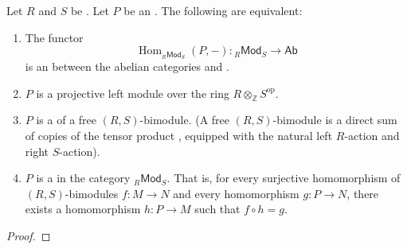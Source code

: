 \begin{proposition} \label{proposition:equivalent_conditions_for_bimodules_over_rings}
    Let $R$ and $S$ be . 
    Let $P$ be an . The following are equivalent:
    \begin{enumerate}
        \item The functor
        \[
            \operatorname{Hom}_{{}_R\mathsf{Mod}_S}(P, -): {}_R\mathsf{Mod}_S \to \mathsf{Ab}
        \]
        is an  between the abelian categories  and .

        \item $P$ is a projective left module over the ring $R \otimes_{\mathbb{Z}} S^{\operatorname{op}}$.

        \item $P$ is a  of a free $(R,S)$-bimodule. (A free $(R,S)$-bimodule is a direct sum of copies of the tensor product , equipped with the natural left $R$-action and right $S$-action).

        \item $P$ is a  in the category ${}_R\mathsf{Mod}_S$. That is, for every surjective homomorphism of $(R,S)$-bimodules $f: M \to N$ and every homomorphism $g: P \to N$, there exists a homomorphism $h: P \to M$ such that $f \circ h = g$.
    \end{enumerate}
\end{proposition}
\begin{proof}
    \TODO{}
\end{proof}
